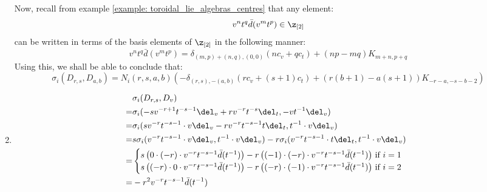\begin{example}
\begin{enumerate}
                Now, recall from example \ref{example: toroidal_lie_algebras_centres} that any element:
                    $$v^n t^q \bar{d}(v^m t^p) \in \z_{[2]}$$
                can be written in terms of the basis elements of $\z_{[2]}$ in the following manner:
                    $$v^n t^q \bar{d}(v^m t^p) = \delta_{(m, p) + (n, q), (0, 0)} ( n c_v + q c_t ) + (np - mq) K_{m + n, p + q}$$
                Using this, we shall be able to conclude that:
                    $$\sigma_i(D_{r, s}, D_{a, b}) = N_i(r, s, a, b) \left( -\delta_{(r, s), -(a, b)} (r c_v + (s + 1) c_t) + ( r(b + 1) - a(s + 1) )K_{-r - a, -s - b - 2} \right)$$
                \item
                    $$
                        \begin{aligned}
                            & \sigma_i(D_{r, s}, D_v)
                            \\
                            = & \sigma_i( -s v^{-r + 1} t^{-s - 1} \del_v + r v^{-r} t^{-s} \del_t, -v t^{-1} \del_v )
                            \\
                            = & \sigma_i( s v^{-r} t^{-s - 1} \cdot v \del_v - r v^{-r} t^{-s - 1} t \del_t, t^{-1} \cdot v \del_v )
                            \\
                            = & s \sigma_i( v^{-r} t^{-s - 1} \cdot v \del_v, t^{-1} \cdot v \del_v ) - r\sigma_i( v^{-r} t^{-s - 1} \cdot t \del_t, t^{-1} \cdot v \del_v )
                            \\
                            = &
                            \begin{cases}
                                \text{$s \left( 0 \cdot (-r) \cdot v^{-r} t^{-s - 1} \bar{d}(t^{-1}) \right) - r \left( (-1) \cdot (-r) \cdot v^{-r} t^{-s - 1} \bar{d}(t^{-1}) \right)$ if $i = 1$}
                                \\
                                \text{$s \left( (-r) \cdot 0 \cdot v^{-r} t^{-s - 1} \bar{d}(t^{-1}) \right) - r \left( (-r) \cdot (-1) \cdot v^{-r} t^{-s - 1} \bar{d}(t^{-1}) \right)$ if $i = 2$}
                            \end{cases}
                            \\
                            = & -r^2 v^{-r} t^{-s - 1} \bar{d}(t^{-1})
                        \end{aligned}
$$
\end{enumerate}
\end{example}
